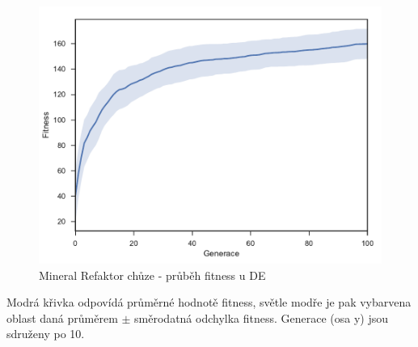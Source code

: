 \begin{figure}[h]\centering
	\includegraphics[width=\columnwidth]{../img/MineralMap/MineralRefaktorWalk}
	\caption{Mineral Refaktor chůze - průběh fitness u DE}
	\label{obr04:MineralRefaktorWalk}
\end{figure}
Modrá křivka odpovídá průměrné hodnotě fitness, světle modře je pak vybarvena oblast daná průměrem $\pm$ směrodatná odchylka fitness. Generace (osa y) jsou sdruženy po 10. 
\clearpage


